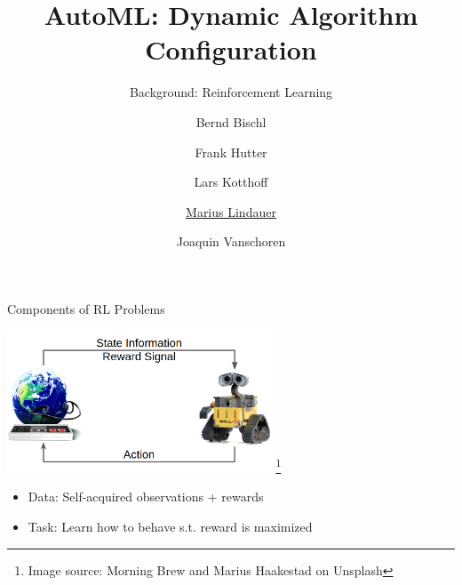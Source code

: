 




\title[AutoML: PBT]{AutoML: Dynamic Algorithm Configuration}
\subtitle{Background: Reinforcement Learning}
\author[Marius Lindauer]{Bernd Bischl \and Frank Hutter \and Lars Kotthoff\newline \and \underline{Marius Lindauer} \and Joaquin Vanschoren}
\institute{}
\date{}


	
	\maketitle

\begin{frame}[c]{Components of RL Problems}
	
	\centering
	\includegraphics[width=0.6\textwidth]{images/rl_comic.png}\footnote{Image source: Morning Brew and Marius Haakestad on Unsplash}
	
	\bigskip
	
	\begin{itemize}
		\item Data: Self-acquired observations + rewards
		\item Task: Learn how to behave s.t. reward is maximized
	\end{itemize}	
	
\end{frame}
